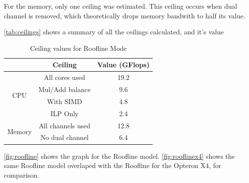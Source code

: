 For the memory, only one ceiling was estimated. This ceiling occurs when dual channel is removed, which theoretically drops memory bandwith to half its value.

\autoref{tab:ceilings} shows a summary of all the ceilings calculated, and it's value

\begin{table}[!htp]
	\begin{center}
		\begin{tabular}{c|c|c|}
				&	Ceiling		&	Value (GFlops)				\\
				\hline
				\hline
			\multicolumn{1}{c|}{\multirow{4}{*}{CPU}}
				&	All cores used		&	19.2				\\
				&	Mul/Add balance		&	9.6					\\
				&	With SIMD			&	4.8					\\
				&	ILP Only			&	2.4					\\
			\hline
			\hline
			\multicolumn{1}{c|}{\multirow{2}{*}{Memory}}
				&	All channels used	&	12.8\footnotemark	\\
				&	No dual channel		&	6.4					\\
				\hline
		\end{tabular}
	\end{center}
	\caption{Ceiling values for Roofline Mode \label{tab:ceilings}}
\end{table}

\autoref{fig:roofline} shows the graph for the Roofline model. \autoref{fig:rooflinex4} shows the same Roofline model overlaped with the Roofline for the Opteron X4, for comparison.

\newpage

